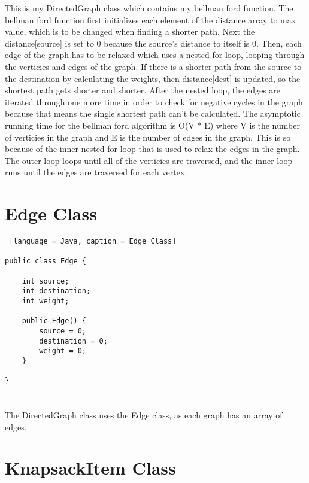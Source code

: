\documentclass{article}
\begin{document}
\noindent This is my DirectedGraph class which contains my bellman ford function. The bellman ford function first initializes each element of the distance array to max value, which is to be changed when finding a shorter path. Next the distance[source] is set to 0 because the source's distance to itself is 0. Then, each edge of the graph has to be relaxed which uses a nested for loop, looping through the verticies and edges of the graph. If there is a shorter path from the source to the destination by calculating the weights, then distance[dest] is updated, so the shortest path gets shorter and shorter. After the nested loop, the edges are iterated through one more time in order to check for negative cycles in the graph because that means the single shortest path can't be calculated. The asymptotic running time for the bellman ford algorithm is O(V * E) where V is the number of verticies in the graph and E is the number of edges in the graph. This is so because of the inner nested for loop that is used to relax the edges in the graph. The outer loop loops until all of the verticies are traversed, and the inner loop runs until the edges are traversed for each vertex. 


\section{Edge Class}

\begin{lstlisting} [language = Java, caption = Edge Class]

public class Edge {

    int source;
    int destination;
    int weight;

    public Edge() {
        source = 0;
        destination = 0;
        weight = 0;
    }
    
}

\end{lstlisting}

\section{} The DirectedGraph class uses the Edge class, as each graph has an array of edges.

\section{KnapsackItem Class}
\end{document}

